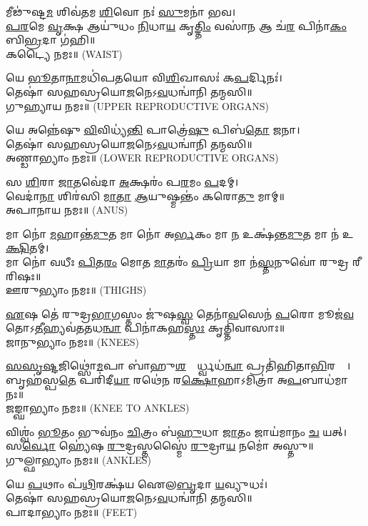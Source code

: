 𑌮𑍀𑌢𑍁॑𑌷𑍍𑌟\ul{𑌮} 𑌶𑌿𑌵॑𑌤𑌮 \ul{𑌶𑌿}𑌵𑍋 𑌨𑌃॑ \ul{𑌸𑍁}𑌮𑌨𑌾॑ 𑌭𑌵।\\
 \ul{𑌪}\ul{𑌰}𑌮𑍇 \ul{𑌵𑍃}𑌕𑍍𑌷 𑌆𑌯𑍁॑𑌧𑌂 \ul{𑌨𑌿}𑌧𑌾\ul{𑌯} 𑌕𑍃\ul{𑌤𑍍𑌤𑌿𑌂} 𑌵𑌸𑌾॑\ul{𑌨} 𑌆 𑌚॑\ul{𑌰} 𑌪𑌿𑌨𑌾॑\ul{𑌕𑌂} 𑌬𑌿\ul{𑌭𑍍𑌰}𑌦𑌾 𑌗॑𑌹𑌿॥\\
𑌕𑌟𑍍𑌯𑍈 𑌨𑌮𑌃॥ {\scriptsize (WAIST)}

 𑌯𑍇 \ul{𑌭𑍂}𑌤𑌾\ul{𑌨𑌾}𑌮𑌧𑌿॑𑌪𑌤𑌯𑍋 𑌵𑌿\ul{𑌶𑌿}𑌖𑌾𑌸𑌃॑ 𑌕\ul{𑌪}𑌰𑍍𑌦𑌿𑌨𑌃॑। \\
𑌤𑍇𑌷𑌾॑ 𑌸𑌹𑌸𑍍𑌰𑌯𑍋\ul{𑌜}𑌨𑍇𑌽\ul{𑌵}𑌧𑌨𑍍𑌵𑌾॑𑌨𑌿 𑌤𑌨𑍍𑌮𑌸𑌿॥ \\
𑌗𑍁𑌹𑍍𑌯𑌾𑌯 𑌨𑌮𑌃॥ {\scriptsize (UPPER REPRODUCTIVE ORGANS)}

𑌯𑍇 𑌅𑌨𑍍𑌨𑍇॑𑌷𑍁 \ul{𑌵𑌿}𑌵𑌿𑌧𑍍𑌯॑\ul{𑌨𑍍𑌤𑌿} 𑌪𑌾𑌤𑍍𑌰𑍇॑\ul{𑌷𑍁} 𑌪𑌿𑌬॑\ul{𑌤𑍋} 𑌜𑌨𑌾\sn{}।\\
𑌤𑍇𑌷𑌾॑ 𑌸𑌹𑌸𑍍𑌰𑌯𑍋\ul{𑌜}𑌨𑍇𑌽\ul{𑌵}𑌧𑌨𑍍𑌵𑌾॑𑌨𑌿 𑌤𑌨𑍍𑌮𑌸𑌿॥ \\
𑌅𑌣𑍍𑌡𑌾𑌭𑍍𑌯𑌾𑌂 𑌨𑌮𑌃॥ {\scriptsize (LOWER REPRODUCTIVE ORGANS)}

𑌸 \ul{𑌶𑌿}𑌰𑌾 \ul{𑌜𑌾}𑌤𑌵𑍇॑𑌦𑌾 \ul{𑌅}𑌕𑍍𑌷𑌰𑌂॑ 𑌪\ul{𑌰}𑌮𑌂 \ul{𑌪}𑌦𑌮𑍍।\\
𑌵𑍇𑌦𑌾॑\ul{𑌨𑌾}\ul{} 𑌶𑌿𑌰॑𑌸𑌿 \ul{𑌮𑌾}\ul{𑌤𑌾} \ul{𑌆}𑌯𑍁𑌷𑍍𑌮𑌨𑍍𑌤𑌂॑ 𑌕𑌰𑍋\ul{𑌤𑍁} 𑌮𑌾𑌮𑍍॥\\
𑌅𑌪𑌾𑌨𑌾𑌯 𑌨𑌮𑌃॥ {\scriptsize (ANUS)}

𑌮𑌾 𑌨𑍋॑ \ul{𑌮}𑌹𑌾𑌨𑍍𑌤॑\ul{𑌮𑍁}𑌤 𑌮𑌾 𑌨𑍋॑ 𑌅\ul{𑌰𑍍𑌭}𑌕𑌂 𑌮𑌾 \ul{𑌨} 𑌉𑌕𑍍𑌷॑𑌨𑍍𑌤\ul{𑌮𑍁}𑌤 𑌮𑌾 𑌨॑ 𑌉\ul{𑌕𑍍𑌷𑌿}𑌤𑌮𑍍।\\
 𑌮𑌾 𑌨𑍋॑ 𑌵𑌧𑍀𑌃 \ul{𑌪𑌿}𑌤\ul{𑌰𑌂} 𑌮𑍋𑌤 \ul{𑌮𑌾}𑌤𑌰𑌂॑ \ul{𑌪𑍍𑌰𑌿}𑌯𑌾 𑌮𑌾 𑌨॑\ul{𑌸𑍍𑌤}𑌨𑍁𑌵𑍋॑ 𑌰𑍁𑌦𑍍𑌰 𑌰𑍀𑌰𑌿𑌷𑌃॥\\
𑌊𑌰𑍁𑌭𑍍𑌯𑌾𑌂 𑌨𑌮𑌃॥ {\scriptsize (THIGHS)}

\ul{𑌏}𑌷 𑌤𑍇॑ 𑌰𑍁𑌦𑍍𑌰\ul{𑌭𑌾}𑌗𑌸𑍍𑌤𑌂 𑌜𑍁॑𑌷\ul{𑌸𑍍𑌵} 𑌤𑍇𑌨𑌾॑\ul{𑌵}𑌸𑍇𑌨॑ \ul{𑌪}𑌰𑍋 𑌮𑍂𑌜॑\ul{𑌵}𑌤𑍋𑌽\ul{𑌤𑍀}\-𑌹𑍍𑌯𑌵॑𑌤𑌤𑌧\ul{𑌨𑍍𑌵𑌾} 𑌪𑌿𑌨𑌾॑𑌕𑌹\ul{𑌸𑍍𑌤𑌃} 𑌕𑍃𑌤𑍍𑌤𑌿॑𑌵𑌾𑌸𑌾𑌃॥\\
𑌜𑌾𑌨𑍁𑌭𑍍𑌯𑌾𑌂 𑌨𑌮𑌃॥ {\scriptsize (KNEES)}

\ul{𑌸}\ul{}\ul{𑌸𑍃}\ul{𑌷𑍍𑌟}𑌜𑌿𑌥𑍍𑌸𑍋॑\ul{𑌮}𑌪𑌾 𑌬𑌾॑𑌹𑍁\ul{𑌶}𑌧𑍍𑌯𑍂᳚𑌰𑍍𑌧𑍍𑌵𑌧॑\ul{𑌨𑍍𑌵𑌾} 𑌪𑍍𑌰𑌤𑌿॑𑌹𑌿𑌤𑌾\ul{𑌭𑌿}𑌰𑌸𑍍𑌤𑌾᳚।\\
𑌬𑍃𑌹॑𑌸𑍍𑌪\ul{𑌤𑍇} 𑌪𑌰𑌿॑𑌦𑍀\ul{𑌯𑌾} 𑌰𑌥𑍇॑𑌨 𑌰\ul{𑌕𑍍𑌷𑍋}𑌹𑌾𑌽𑌮𑌿𑌤𑍍𑌰𑌾॑ 𑌅\ul{𑌪}𑌬𑌾𑌧॑𑌮𑌾𑌨𑌃॥\\
𑌜𑌙𑍍𑌘𑌾𑌭𑍍𑌯𑌾𑌂 𑌨𑌮𑌃॥ {\scriptsize (KNEE TO ANKLES)}

𑌵𑌿𑌶𑍍𑌵𑌂॑ \ul{𑌭𑍂}𑌤𑌂 𑌭𑍁𑌵॑𑌨𑌂 \ul{𑌚𑌿}𑌤𑍍𑌰𑌂 𑌬॑\ul{𑌹𑍁}𑌧𑌾 \ul{𑌜𑌾}𑌤𑌂 𑌜𑌾𑌯॑𑌮𑌾𑌨𑌂 \ul{𑌚} 𑌯𑌤𑍍।\\
𑌸\ul{𑌰𑍍𑌵𑍋} 𑌹𑍍𑌯𑍇॑𑌷 \ul{𑌰𑍁}𑌦𑍍𑌰𑌸𑍍𑌤𑌸𑍍𑌮𑍈॑ \ul{𑌰𑍁}𑌦𑍍𑌰𑌾\ul{𑌯} 𑌨𑌮𑍋॑ 𑌅𑌸𑍍𑌤𑍁॥\\
𑌗𑍁𑌲𑍍𑌫𑌾𑌭𑍍𑌯𑌾𑌂 𑌨𑌮𑌃॥ {\scriptsize (ANKLES)}

𑌯𑍇 \ul{𑌪}𑌥𑌾𑌂 𑌪॑\ul{𑌥𑌿}𑌰𑌕𑍍𑌷॑𑌯 𑌐𑌲\ul{𑌬𑍃}𑌦𑌾 \ul{𑌯}𑌵𑍍𑌯𑍁𑌧𑌃॑।\\
𑌤𑍇𑌷𑌾॑ 𑌸𑌹𑌸𑍍𑌰𑌯𑍋\ul{𑌜}𑌨𑍇𑌽\ul{𑌵}𑌧𑌨𑍍𑌵𑌾॑𑌨𑌿 𑌤𑌨𑍍𑌮𑌸𑌿॥ \\
𑌪𑌾𑌦𑌾𑌭𑍍𑌯𑌾𑌂 𑌨𑌮𑌃॥ {\scriptsize (FEET)}


